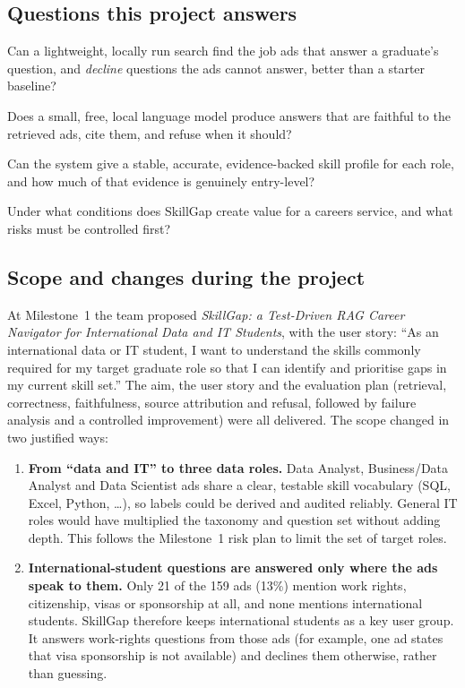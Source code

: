 \subsection{Questions this project answers}

\begin{description}[leftmargin=0pt]
  \item[RQ1 Retrieval and refusal.] Can a lightweight, locally run search find the job ads that answer a graduate's question, and \emph{decline} questions the ads cannot answer, better than a starter baseline?
  \item[RQ2 Grounded answers.] Does a small, free, local language model produce answers that are faithful to the retrieved ads, cite them, and refuse when it should?
  \item[RQ3 Skill-gap evidence.] Can the system give a stable, accurate, evidence-backed skill profile for each role, and how much of that evidence is genuinely entry-level?
  \item[RQ4 Business value.] Under what conditions does SkillGap create value for a careers service, and what risks must be controlled first?
\end{description}

\subsection{Scope and changes during the project}

At Milestone~1 the team proposed \emph{SkillGap: a Test-Driven RAG Career Navigator for International Data and IT Students}, with the user story: ``As an international data or IT student, I want to understand the skills commonly required for my target graduate role so that I can identify and prioritise gaps in my current skill set.'' The aim, the user story and the evaluation plan (retrieval, correctness, faithfulness, source attribution and refusal, followed by failure analysis and a controlled improvement) were all delivered. The scope changed in two justified ways:

\begin{enumerate}
  \item \textbf{From ``data and IT'' to three data roles.} Data Analyst, Business/Data Analyst and Data Scientist ads share a clear, testable skill vocabulary (SQL, Excel, Python, \dots), so labels could be derived and audited reliably. General IT roles would have multiplied the taxonomy and question set without adding depth. This follows the Milestone~1 risk plan to limit the set of target roles.
  \item \textbf{International-student questions are answered only where the ads speak to them.} Only 21 of the 159 ads (13\%) mention work rights, citizenship, visas or sponsorship at all, and none mentions international students. SkillGap therefore keeps international students as a key user group. It answers work-rights questions from those ads (for example, one ad states that visa sponsorship is not available) and declines them otherwise, rather than guessing.
\end{enumerate}

